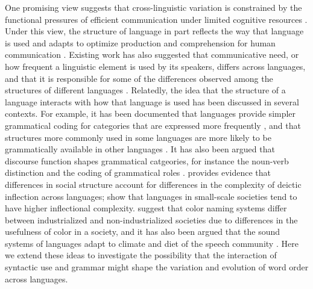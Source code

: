 \documentclass[9pt,twocolumn,twoside,lineno]{pnas-new}
\begin{document}
One promising view suggests that cross-linguistic variation is constrained by the functional pressures of efficient communication under limited cognitive resources \citep{haspelmath2008parametric, jaeger2011on, kemp2018semantic, gibson2019how}.
Under this view, the structure of language in part reflects the way that language is used \citep{hopper1984the, bybee1994the, croft2000explaining, bybee2006from} and adapts to optimize production and comprehension for human communication \citep{hawkins-performance-1994, haspelmath2006against, bybee2010language}.
Existing work has also suggested that communicative need, or how frequent a linguistic element is used by its speakers, differs across languages, and that it is responsible for some of the differences observed among the structures of different languages \cite{perkins1992deixis, lupyan2010language, gibson2017color}. %
Relatedly, the idea that the structure of a language interacts with how that language is used has been discussed in several contexts.
For example, it has  been documented that languages provide simpler grammatical coding for categories that are expressed more frequently \citep{greenberg1966language, haspelmath2006against}, and that structures more commonly used in some languages are more likely to be grammatically available in other languages \citep{keenan1975variation}.
It has also been argued that discourse function shapes grammatical catgeories, for instance the noun-verb distinction \citep{hopper1984the} and the coding of grammatical roles \citep{bois1987the}.
\cite{perkins1992deixis} provides evidence that differences in social structure account for differences in the complexity of deictic inflection across languages; \cite{lupyan2010language} show that languages in small-scale societies tend to have higher inflectional complexity.
\cite{gibson2017color} suggest that color naming systems differ between industrialized and non-industrialized societies due to differences in the usefulness of color in a society, and it has also been argued that the sound systems of languages adapt to climate and diet of the speech community \citep{everett2015climate,blasi2019human}. Here we extend these ideas to investigate the possibility that the interaction of syntactic use and grammar might shape the variation and evolution of word order across languages.
\end{document}
